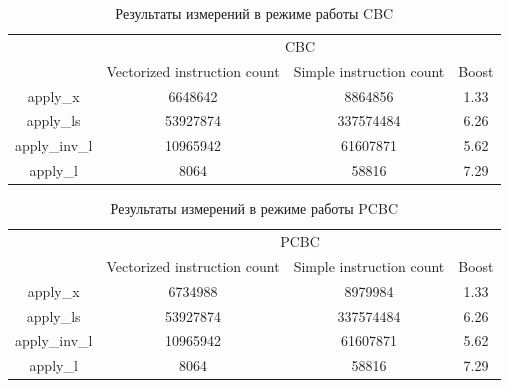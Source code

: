 \documentclass[a4paper, 12pt]{article}
\begin{document}
    \begin{table}[]
    \begin{center}
    \begin{tabular}{|c|ccc|}
    \hline
    \multirow{2}{*}{} & \multicolumn{3}{c|}{CBC}                                                                                  \\ \cline{2-4} 
                      & \multicolumn{1}{c|}{Vectorized instruction count} & \multicolumn{1}{c|}{Simple instruction count} & Boost \\ \hline
    apply\_x          & \multicolumn{1}{c|}{6648642}                      & \multicolumn{1}{c|}{8864856}                  & 1.33  \\ \hline
    apply\_ls         & \multicolumn{1}{c|}{53927874}                     & \multicolumn{1}{c|}{337574484}                & 6.26  \\ \hline
    apply\_inv\_l     & \multicolumn{1}{c|}{10965942}                     & \multicolumn{1}{c|}{61607871}                 & 5.62  \\ \hline
    apply\_l          & \multicolumn{1}{c|}{8064}                         & \multicolumn{1}{c|}{58816}                    & 7.29  \\ \hline
    \end{tabular}
    \end{center}
    \caption{Результаты измерений в режиме работы CBC}
    \label{tab:result_CBC}
    \end{table}

    \begin{table}[]
    \begin{center}
    \begin{tabular}{|c|ccc|}
    \hline
    \multirow{2}{*}{} & \multicolumn{3}{c|}{PCBC}                                                                                 \\ \cline{2-4} 
                      & \multicolumn{1}{c|}{Vectorized instruction count} & \multicolumn{1}{c|}{Simple instruction count} & Boost \\ \hline
    apply\_x          & \multicolumn{1}{c|}{6734988}                      & \multicolumn{1}{c|}{8979984}                  & 1.33  \\ \hline
    apply\_ls         & \multicolumn{1}{c|}{53927874}                     & \multicolumn{1}{c|}{337574484}                & 6.26  \\ \hline
    apply\_inv\_l     & \multicolumn{1}{c|}{10965942}                     & \multicolumn{1}{c|}{61607871}                 & 5.62  \\ \hline
    apply\_l          & \multicolumn{1}{c|}{8064}                         & \multicolumn{1}{c|}{58816}                    & 7.29  \\ \hline
    \end{tabular}
    \end{center}
    \caption{Результаты измерений в режиме работы PCBC}
    \label{tab:result_PBC}
    \end{table}
\end{document}
